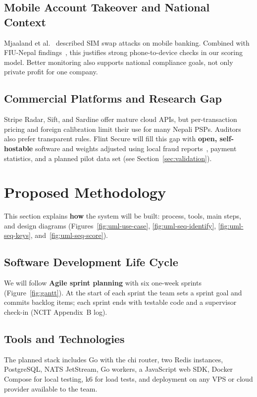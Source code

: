 \subsection{Mobile Account Takeover and National Context}
Mjaaland et al.~\cite{mjaaland2021} described SIM swap attacks on mobile banking. Combined
with FIU-Nepal findings~\cite{fiu2024}, this justifies strong phone-to-device checks in our
scoring model. Better monitoring also supports national compliance goals, not only private
profit for one company.

\subsection{Commercial Platforms and Research Gap}
Stripe Radar, Sift, and Sardine offer mature cloud APIs, but per-transaction pricing and
foreign calibration limit their use for many Nepali PSPs. Auditors also prefer transparent
rules. Flint Secure will fill this gap with \textbf{open, self-hostable} software and weights
adjusted using local fraud reports~\cite{fiu2024}, payment statistics, and a planned pilot data
set (see Section~\ref{sec:validation}).

\section{Proposed Methodology}
\label{sec:methodology}

This section explains \textbf{how} the system will be built: process, tools, main steps, and
design diagrams (Figures~\ref{fig:uml-use-case}, \ref{fig:uml-seq-identify}, \ref{fig:uml-seq-keys}, and~\ref{fig:uml-seq-score}).

\subsection{Software Development Life Cycle}
We will follow \textbf{Agile sprint planning} with six one-week sprints (Figure~\ref{fig:gantt}).
At the start of each sprint the team sets a sprint goal and commits backlog items; each sprint
ends with testable code and a supervisor check-in (NCIT Appendix~B log).

\subsection{Tools and Technologies}
The planned stack includes Go with the chi router, two Redis instances, PostgreSQL, NATS
JetStream, Go workers, a JavaScript web SDK, Docker Compose for local testing, k6 for load
tests, and deployment on any VPS or cloud provider available to the team.

